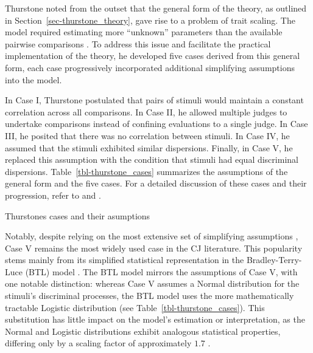 \documentclass[
  authoryear,
  review,
  1p]{elsarticle}
\begin{document}
Thurstone noted from the outset that the general form of the theory, as
outlined in Section~\ref{sec-thurstone_theory}, gave rise to a problem
of trait scaling. The model required estimating more ``unknown''
parameters than the available pairwise comparisons
\citep[pp.~267]{Thurstone_1927b}. To address this issue and facilitate
the practical implementation of the theory, he developed five cases
derived from this general form, each case progressively incorporated
additional simplifying assumptions into the model.

In Case I, Thurstone postulated that pairs of stimuli would maintain a
constant correlation across all comparisons. In Case II, he allowed
multiple judges to undertake comparisons instead of confining
evaluations to a single judge. In Case III, he posited that there was no
correlation between stimuli. In Case IV, he assumed that the stimuli
exhibited similar dispersions. Finally, in Case V, he replaced this
assumption with the condition that stimuli had equal discriminal
dispersions. Table~\ref{tbl-thurstone_cases} summarizes the assumptions
of the general form and the five cases. For a detailed discussion of
these cases and their progression, refer to \citet{Thurstone_1927b} and
\citet[pp.~248--253]{Bramley_2008}.

\begin{table}

\caption{\label{tbl-thurstone_cases}Thurstones cases and their
asumptions}


\end{table}%

Notably, despite relying on the most extensive set of simplifying
assumptions
\citetext{\citealp[pp.~253]{Bramley_2008}; \citealp[pp.~677]{Kelly_et_al_2022}},
Case V remains the most widely used case in the CJ literature. This
popularity stems mainly from its simplified statistical representation
in the Bradley-Terry-Luce (BTL) model
\citep{Bradley_et_al_1952, Luce_1959}. The BTL model mirrors the
assumptions of Case V, with one notable distinction: whereas Case V
assumes a Normal distribution for the stimuli's discriminal processes,
the BTL model uses the more mathematically tractable Logistic
distribution \citep[pp.~254]{Andrich_1978, Bramley_2008} (see
Table~\ref{tbl-thurstone_cases}). This substitution has little impact on
the model's estimation or interpretation, as the Normal and Logistic
distributions exhibit analogous statistical properties, differing only
by a scaling factor of approximately \(1.7\)
\citep[pp.~16]{vanderLinden_et_al_2017_I}.
\end{document}
